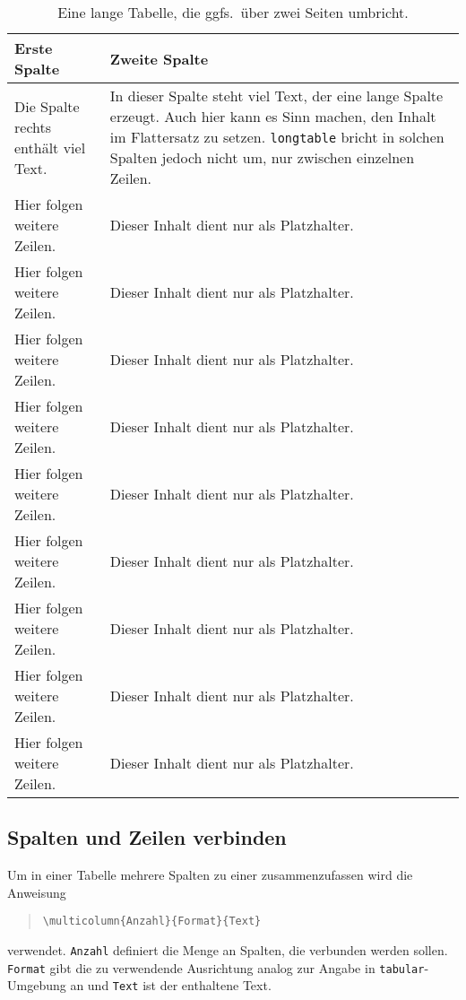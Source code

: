 {\setlength{\tabcolsep}{10pt} %
\def\arraystretch{1.50}      %
\begin{longtable}{@{}lp{}@{}}
	\caption{Eine lange Tabelle, die ggfs.\ über zwei Seiten umbricht.} \\
	\toprule
	Erste Spalte & Zweite Spalte \\
	\midrule\endhead
	\label{tab:longtable}
	Die Spalte rechts enthält viel Text. &
	In dieser Spalte steht viel Text, der eine lange Spalte
	erzeugt. Auch hier kann es Sinn machen, den Inhalt im Flattersatz zu
	setzen. \texttt{longtable} bricht in solchen Spalten jedoch nicht um,
	nur zwischen einzelnen Zeilen. \\
	Hier folgen weitere Zeilen. & Dieser Inhalt dient nur als Platzhalter. \\
	Hier folgen weitere Zeilen. & Dieser Inhalt dient nur als Platzhalter. \\
	Hier folgen weitere Zeilen. & Dieser Inhalt dient nur als Platzhalter. \\
	Hier folgen weitere Zeilen. & Dieser Inhalt dient nur als Platzhalter. \\
	Hier folgen weitere Zeilen. & Dieser Inhalt dient nur als Platzhalter. \\
	Hier folgen weitere Zeilen. & Dieser Inhalt dient nur als Platzhalter. \\
	Hier folgen weitere Zeilen. & Dieser Inhalt dient nur als Platzhalter. \\
	Hier folgen weitere Zeilen. & Dieser Inhalt dient nur als Platzhalter. \\
	Hier folgen weitere Zeilen. & Dieser Inhalt dient nur als Platzhalter. \\
	\bottomrule
\end{longtable}}

\subsection{Spalten und Zeilen verbinden}

Um in einer Tabelle mehrere Spalten zu einer zusammenzufassen wird die Anweisung
%
\begin{quote}
	\verb!\multicolumn{Anzahl}{Format}{Text}!
\end{quote}
%
verwendet. \texttt{Anzahl} definiert die Menge an Spalten, die verbunden
werden sollen. \texttt{Format} gibt die zu verwendende Ausrichtung analog zur
Angabe in \texttt{tabular}-Umgebung an und \texttt{Text} ist der enthaltene
Text.

